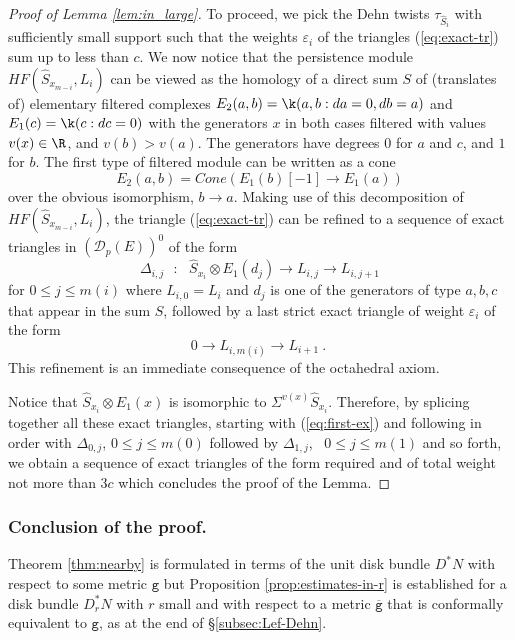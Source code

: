 \begin{proof}[Proof of Lemma \ref{lem:in_large}]
To proceed, we pick the Dehn twists $\tau_{\hat{S}_{i}}$ with
sufficiently small support such that the weights $\varepsilon_{i}$ of the triangles
(\ref{eq:exact-tr}) sum up to less than $c$.  We now notice that the persistence module $HF(\hat{S}_{x_{m-i}}, L_{i})$ can be viewed as the homology of a direct sum  $S$ of (translates of) elementary filtered complexes
$E_{2}(a, b)=\k(a, b:  da=0, db=a)$ and $E_{1}(c)=\k(c : dc=0)$ with the generators $x$ in both cases filtered with values $v(x)\in \R$, and $v(b)> v(a)$. The generators have degrees $0$ for $a$ and $c$, and $1$ for $b$.
The first type of filtered module can be written as a cone
$$E_{2}(a,b)=Cone \left( E_{1}(b)[-1]\to  E_{1}(a) \right)$$ over the obvious isomorphism, $b\to a$. Making use of this decomposition of $HF(\hat{S}_{x_{m-i}}, L_{i})$, the triangle (\ref{eq:exact-tr})
can be refined to a sequence of exact triangles in $(\mathscr{D}_{p}(E))^{0}$ of the form
\begin{equation}\label{eq:tr-ref}
\Delta_{i,j} \ \ \ : \ \ \ \hat{S}_{x_{i}}\otimes  E_{1}(d_{j})\to L_{i,j}\to L_{i,j+1}
\end{equation}
for $0\leq j\leq m(i)$
where $L_{i,0}=L_{i}$ and $d_{j}$ is one of the generators of type $a,b, c$ that appear in the sum $S$, followed by a last strict exact triangle of weight $\varepsilon_{i}$ of
 the form 
 $$0\longrightarrow L_{i,m(i)}\longrightarrow L_{i+1}~.~$$
 This refinement is an immediate consequence of the octahedral axiom.

Notice that $\hat{S}_{x_{i}}\otimes E_{1}(x)$ is isomorphic to
$\Sigma^{v(x)}\hat{S}_{x_{i}}$. Therefore, by splicing together
all these exact triangles, starting with (\ref{eq:first-ex}) and following in order with $\Delta_{0, j}$, $0\leq  j\leq m(0)$ followed by   $\Delta_{1,j}$, \ $0\leq  j \leq m(1)$ and so forth, we obtain a sequence of exact triangles of the form required and of total weight not more than $3c$ which concludes the proof of the Lemma.
\end{proof}


\subsubsection{Conclusion of the proof.}\label{subsec:general} 
Theorem \ref{thm:nearby} is formulated in terms of the unit disk
bundle $D^{\ast}N$ with respect to some metric $\mathtt{g}$ but 
Proposition \ref{prop:estimates-in-r} is established for a disk bundle
$D^{\ast}_{r}N$ with $r$ small and with respect to a metric 
$\overline{\mathtt{g}}$ that is conformally equivalent to $\mathtt{g}$, as at the end of \S\ref{subsec:Lef-Dehn}.
 
